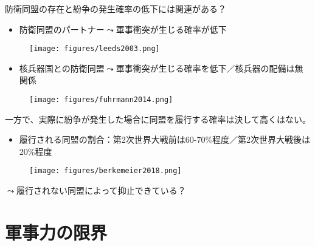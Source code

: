 \documentclass[
  xelatex,
  ja=standard]{bxjsarticle}
\providecommand{\tightlist}{%
  \setlength{\itemsep}{0pt}\setlength{\parskip}{0pt}}\usepackage{longtable,booktabs,array}
\begin{document}
防衛同盟の存在と紛争の発生確率の低下には関連がある？

\begin{itemize}
\tightlist
\item
  防衛同盟のパートナー\(\leadsto\)軍事衝突が生じる確率が低下\citep{leeds2003}
\end{itemize}

\begin{figure}[htpb]

{\centering \texttt{[image: figures/leeds2003.png]}

}

\caption{\citet{leeds2003}}

\end{figure}

\begin{itemize}
\tightlist
\item
  核兵器国との防衛同盟\(\leadsto\)軍事衝突が生じる確率を低下／核兵器の配備は無関係\citep{fuhrmann2014}
\end{itemize}

\begin{figure}[htpb]

{\centering \texttt{[image: figures/fuhrmann2014.png]}

}

\caption{\citet{fuhrmann2014}}

\end{figure}

一方で、実際に紛争が発生した場合に同盟を履行する確率は決して高くはない。

\begin{itemize}
\tightlist
\item
  履行される同盟の割合：第2次世界大戦前は60-70\%程度／第2次世界大戦後は20\%程度\citep{berkemeier2018}
\end{itemize}

\begin{figure}[htpb]

{\centering \texttt{[image: figures/berkemeier2018.png]}

}

\caption{\citet{berkemeier2018}}

\end{figure}

\(\leadsto\)履行されない同盟によって抑止できている？

\hypertarget{ux8ecdux4e8bux529bux306eux9650ux754c}{%
\section{軍事力の限界}\label{ux8ecdux4e8bux529bux306eux9650ux754c}}
\end{document}
